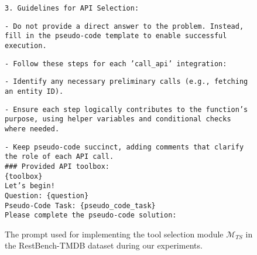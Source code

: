 \begin{figure*}[ht]
\begin{tcolorbox}[colback=white!95!blue, colframe=blue!40!, title=Prompt for Tool Selection Module $\mathcal{M}_{TS}$, width=\textwidth]
\texttt{3. Guidelines for API Selection:}\\
\parbox{2pt}{\hspace{8em}} \texttt{- Do not provide a direct answer to the problem. Instead, fill in the pseudo-code template to enable successful execution.}\\
\parbox{2pt}{\hspace{8em}} \texttt{- Follow these steps for each 'call\_api' integration:}\\
\parbox{2pt}{\hspace{8em}} \quad \texttt{- Identify any necessary preliminary calls (e.g., fetching an entity ID).}\\
\parbox{2pt}{\hspace{8em}} \quad \texttt{- Ensure each step logically contributes to the function’s purpose, using helper variables and conditional checks where needed.}\\
\parbox{2pt}{\hspace{8em}} \quad \texttt{- Keep pseudo-code succinct, adding comments that clarify the role of each API call.}\\

\texttt{\#\#\# Provided API toolbox:}\\
\texttt{\{toolbox\}}\\

\texttt{Let's begin!}\\
\texttt{Question: \{question\}}\\
\texttt{Pseudo-Code Task: \{pseudo\_code\_task\}}\\
\texttt{Please complete the pseudo-code solution:}
\end{tcolorbox}
\caption{The prompt used for implementing the tool selection module $\mathcal{M}_{TS}$ in the RestBench-TMDB dataset during our experiments.}
\label{fig:tool_selection_prompt}
\end{figure*}